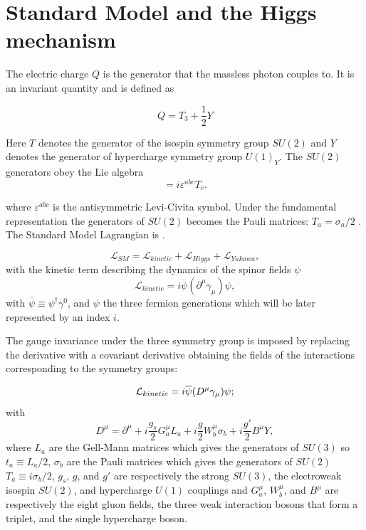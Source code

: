\section{Standard Model and the Higgs mechanism}
\label{sec::SM_appendix}

The electric charge $Q$ is the generator that the massless photon couples to. It is an invariant quantity and is defined as \cite{zee2003quantum}

\begin{equation}
Q = T_3 + \frac{1}{2}Y
\label{eqn:electricchargegenerator}
\end{equation}

Here $T$ denotes the generator of the isospin symmetry group $SU(2)$ and $Y$ denotes the generator of hypercharge symmetry group $U(1)_Y$. The $SU(2)$ generators obey the Lie algebra
\begin{equation}
[T^a, T^b] = i\varepsilon^{abc}T_c.
\label{eqn:su2liealgebr}
\end{equation}

where $\varepsilon^{abc}$ is the antisymmetric Levi-Civita symbol. Under the fundamental representation the generators of $SU(2)$  becomes the Pauli matrices: $T_a = \sigma_a/2$ \cite{roubillard2005th}. The Standard Model Lagrangian is \cite{noteskooijman11}.

\begin{equation}
\mathcal L_{SM} = \mathcal L_{kinetic} + \mathcal L_{Higgs} + \mathcal L_{Yukawa},
\label{eqn:SMLagrangian}
\end{equation}
with the kinetic term describing the dynamics of the spinor fields $\psi$
\begin{equation}
\mathcal L_{kinetic} = i\overline{\psi}(\partial^\mu\gamma_\mu)\psi,
\label{eqn:SMLkinetic}
\end{equation}
with $\overline{\psi} \equiv \psi^\dag\gamma^0$, and $\psi$ the three fermion generations which will be later represented by an index $i$. 

The gauge invariance under the three symmetry group is imposed by replacing the derivative with a covariant derivative obtaining the fields of the interactions corresponding to the symmetry groups:

\begin{equation}
\mathcal L_{kinetic} =  i\overline{\psi}(D^\mu\gamma_\mu)\psi \\;
\label{eqn:newSMLkinetic}
\end{equation}
with
\begin{equation}
D^\mu = \partial^\mu + i\frac{g_s}{2}G^\mu_aL_a + i\frac{g}{2}W^\mu_b\sigma_b+i\frac{g'}{2}B^\mu Y,
\label{eqn:SMcovariant}
\end{equation}
where $L_a$ are the Gell-Mann matrices which gives the generators of $SU(3)$ so $t_a \equiv L_a/2$, $\sigma_b$ are the Pauli matrices which gives the generators of $SU(2)$ $T_a \equiv i\sigma_b/2$, $g_s$, $g$, and $g'$ are respectively the strong $SU(3)$, the electroweak isospin $SU(2)$, and hypercharge $U(1)$ couplings and $G^\mu_a$, $W^\mu_b$, and $B^\mu$ are respectively the eight gluon fields, the three weak interaction bosons that form a triplet, and the single hypercharge boson.

